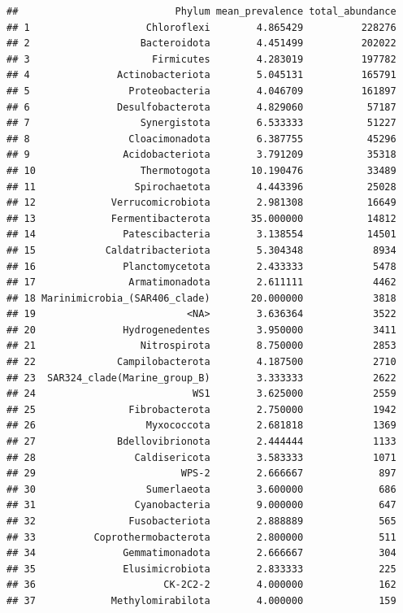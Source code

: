 \documentclass[
]{book}
\begin{document}
\begin{verbatim}
##                           Phylum mean_prevalence total_abundance
## 1                    Chloroflexi        4.865429          228276
## 2                   Bacteroidota        4.451499          202022
## 3                     Firmicutes        4.283019          197782
## 4               Actinobacteriota        5.045131          165791
## 5                 Proteobacteria        4.046709          161897
## 6               Desulfobacterota        4.829060           57187
## 7                   Synergistota        6.533333           51227
## 8                 Cloacimonadota        6.387755           45296
## 9                Acidobacteriota        3.791209           35318
## 10                  Thermotogota       10.190476           33489
## 11                 Spirochaetota        4.443396           25028
## 12             Verrucomicrobiota        2.981308           16649
## 13             Fermentibacterota       35.000000           14812
## 14               Patescibacteria        3.138554           14501
## 15            Caldatribacteriota        5.304348            8934
## 16               Planctomycetota        2.433333            5478
## 17                Armatimonadota        2.611111            4462
## 18 Marinimicrobia_(SAR406_clade)       20.000000            3818
## 19                          <NA>        3.636364            3522
## 20               Hydrogenedentes        3.950000            3411
## 21                  Nitrospirota        8.750000            2853
## 22              Campilobacterota        4.187500            2710
## 23  SAR324_clade(Marine_group_B)        3.333333            2622
## 24                           WS1        3.625000            2559
## 25                Fibrobacterota        2.750000            1942
## 26                   Myxococcota        2.681818            1369
## 27              Bdellovibrionota        2.444444            1133
## 28                 Caldisericota        3.583333            1071
## 29                         WPS-2        2.666667             897
## 30                   Sumerlaeota        3.600000             686
## 31                 Cyanobacteria        9.000000             647
## 32                Fusobacteriota        2.888889             565
## 33          Coprothermobacterota        2.800000             511
## 34               Gemmatimonadota        2.666667             304
## 35               Elusimicrobiota        2.833333             225
## 36                      CK-2C2-2        4.000000             162
## 37             Methylomirabilota        4.000000             159

\end{verbatim}
\end{document}
